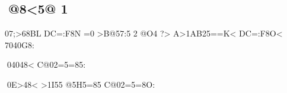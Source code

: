 \documentclass{article}
\begin{document}
\subsection{\textbf{@8<5@ 1}}
\begin{maplegroup}
\begin{mapleinput}
\end{mapleinput}
\end{maplegroup}
\begin{maplegroup}
\begin{Maple Normal}{
 07;>68BL DC=:F8N
=0 >B@57:5
2 @O4 ?> A>1AB25==K< DC=:F8O< 7040G8:}\end{Maple Normal}

\begin{Maple Normal}{
}\end{Maple Normal}
\end{maplegroup}
\begin{maplegroup}
\begin{Maple Normal}{
04048< C@02=5=85:}\end{Maple Normal}

\end{maplegroup}
\begin{maplegroup}
\begin{mapleinput}
\end{mapleinput}
\mapleresult
\begin{maplelatex}
\end{maplelatex}
\end{maplegroup}
\begin{maplegroup}
\begin{Maple Normal}{
0E>48< >1I55 @5H5=85 C@02=5=8O:}\end{Maple Normal}

\end{maplegroup}
\end{document}
